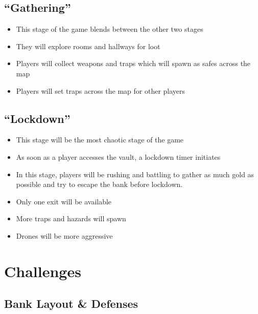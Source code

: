 \documentclass[10pt]{report}
\begin{document}
\subsection{``Gathering''}

\begin{itemize}
    \item This stage of the game blends between the other two stages
    \item They will explore rooms and hallways for loot
    \item Players will collect weapons and traps which will spawn as safes across the map
    \item Players will set traps across the map for other players     
\end{itemize}

\subsection{``Lockdown''}

\begin{itemize}
    \item This stage will be the most chaotic stage of the game
    \item As soon as a player accesses the vault, a lockdown timer initiates
    \item In this stage, players will be rushing and battling to gather as much gold as possible and try to escape the bank before lockdown.
    \item Only one exit will be available
    \item More traps and hazards will spawn
    \item Drones will be more aggressive
\end{itemize}

\section{Challenges}    

\subsection{Bank Layout \& Defenses}
\end{document}
